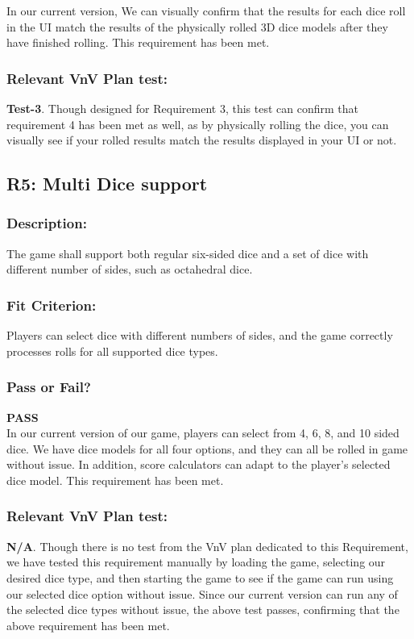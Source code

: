 \documentclass[12pt, titlepage]{article}
\begin{document}
 \noindent In our current version, We can visually confirm that the results for each dice roll in the UI match the results of the physically rolled 3D dice models after they have finished rolling. This requirement has been met.
 
  \subsubsection{Relevant VnV Plan test: } \textbf{ Test-3}. Though designed for Requirement 3, this test can confirm that requirement 4 has been met as well, as by physically rolling the dice, you can visually see if your rolled results match the results displayed in your UI or not.
  
\subsection{R5: Multi Dice support} 

\subsubsection{Description:}The game shall support both regular six-sided dice and a set of dice with different number of sides, such as octahedral dice.

\subsubsection{Fit Criterion:} Players can select dice with different numbers of sides, and the game correctly processes rolls for all supported dice types.

\subsubsection{Pass or Fail?} 

 \noindent \textbf{PASS}\\
 
 \noindent In our current version of our game, players can select from 4, 6, 8, and 10 sided dice. We have dice models for all four options, and they can all be rolled in game without issue. In addition, score calculators can adapt to the player's selected dice model. This requirement has been met.

\subsubsection{Relevant VnV Plan test: } \textbf{N/A}. Though there is no test from the VnV plan dedicated to this Requirement, we have tested this requirement manually by loading the game, selecting our desired dice type, and then starting the game to see if the game can run using our selected dice option without issue. Since our current version can run any of the selected dice types without issue, the above test passes, confirming that the above requirement has been met.
\end{document}
